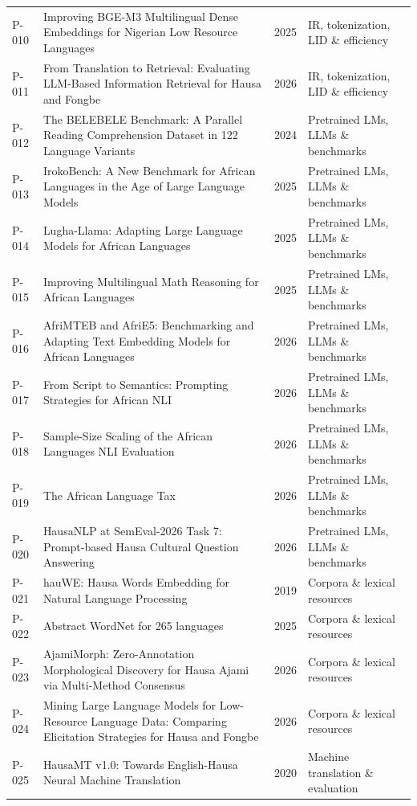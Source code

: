 \begin{longtable}{@{}p{} p{} p{} p{}@{}}
P-010 & Improving BGE-M3 Multilingual Dense Embeddings for Nigerian Low Resource Languages & 2025 & IR, tokenization, LID \& efficiency \\
P-011 & From Translation to Retrieval: Evaluating LLM-Based Information Retrieval for Hausa and Fongbe & 2026 & IR, tokenization, LID \& efficiency \\
P-012 & The BELEBELE Benchmark: A Parallel Reading Comprehension Dataset in 122 Language Variants & 2024 & Pretrained LMs, LLMs \& benchmarks \\
P-013 & IrokoBench: A New Benchmark for African Languages in the Age of Large Language Models & 2025 & Pretrained LMs, LLMs \& benchmarks \\
P-014 & Lugha-Llama: Adapting Large Language Models for African Languages & 2025 & Pretrained LMs, LLMs \& benchmarks \\
P-015 & Improving Multilingual Math Reasoning for African Languages & 2025 & Pretrained LMs, LLMs \& benchmarks \\
P-016 & AfriMTEB and AfriE5: Benchmarking and Adapting Text Embedding Models for African Languages & 2026 & Pretrained LMs, LLMs \& benchmarks \\
P-017 & From Script to Semantics: Prompting Strategies for African NLI & 2026 & Pretrained LMs, LLMs \& benchmarks \\
P-018 & Sample-Size Scaling of the African Languages NLI Evaluation & 2026 & Pretrained LMs, LLMs \& benchmarks \\
P-019 & The African Language Tax & 2026 & Pretrained LMs, LLMs \& benchmarks \\
P-020 & HausaNLP at SemEval-2026 Task 7: Prompt-based Hausa Cultural Question Answering & 2026 & Pretrained LMs, LLMs \& benchmarks \\
P-021 & hauWE: Hausa Words Embedding for Natural Language Processing & 2019 & Corpora \& lexical resources \\
P-022 & Abstract WordNet for 265 languages & 2025 & Corpora \& lexical resources \\
P-023 & AjamiMorph: Zero-Annotation Morphological Discovery for Hausa Ajami via Multi-Method Consensus & 2026 & Corpora \& lexical resources \\
P-024 & Mining Large Language Models for Low-Resource Language Data: Comparing Elicitation Strategies for Hausa and Fongbe & 2026 & Corpora \& lexical resources \\
P-025 & HausaMT v1.0: Towards English-Hausa Neural Machine Translation & 2020 & Machine translation \& evaluation \\

\end{longtable}
